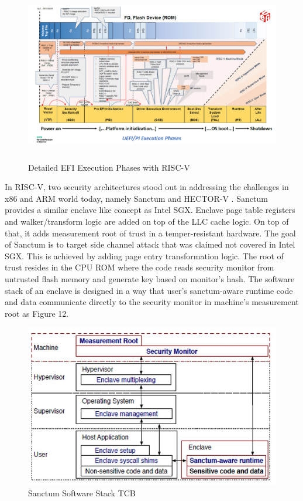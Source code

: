 \documentclass[review]{elsarticle}
\begin{document}
\begin{figure}[H]
	\centering
	\includegraphics[width=1\textwidth,height=3in]{figs/RiscVDetailedEfiFlow.JPG}
	\caption{Detailed EFI Execution Phases with RISC-V \cite{R51:2}}
\end{figure}

In RISC-V, two security architectures stood out in addressing the challenges in x86 and ARM world today, namely Sanctum \cite{R5:6} and HECTOR-V \cite{R5:5}. Sanctum provides a similar enclave like concept as Intel SGX. Enclave page table registers and walker/transform logic are added on top of the LLC cache logic. On top of that, it adds measurement root of trust in a temper-resistant hardware. The goal of Sanctum is to target side channel attack that was claimed not covered in Intel SGX. This is achieved by adding page entry transformation logic. The root of trust resides in the CPU ROM where the code reads security monitor from untrusted flash memory and generate key based on monitor’s hash. The software stack of an enclave is designed in a way that user’s sanctum-aware runtime code and data communicate directly to the security monitor in machine’s measurement root as Figure 12.

\begin{figure}[H]
	\centering
	\includegraphics[width=1\textwidth]{figs/SanctumSwStack.JPG}
	\caption{Sanctum Software Stack TCB \cite{R5:5}}
\end{figure}
\end{document}
